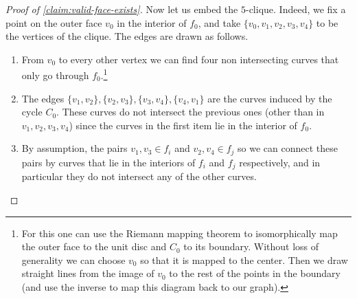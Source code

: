 \documentclass[10pt,a4paper]{article}
\newcommand{\prettyref}[1]{\cref{#1}}
\theoremstyle{definition}
\theoremstyle{remark}
\newcommand{\set}[1]{\{#1\}}
\numberwithin{equation}{section}
\let\pref=\prettyref
\begin{document}
\begin{proof}[Proof of \pref{claim:valid-face-exists}]
    Now let us embed the \(5\)-clique. Indeed, we fix a point on the outer face \(v_0\) in the interior of \(f_0\), and take \(\set{v_0,v_1,v_2,v_3,v_4}\) to be the vertices of the clique. The edges are drawn as follows.
    \begin{enumerate}
        \item From \(v_0\) to every other vertex we can find four non intersecting curves that only go through \(f_0\).\footnote{For this one can use the Riemann mapping theorem to isomorphically map the outer face to the unit disc and \(C_0\) to its boundary. Without loss of generality we can choose \(v_0\) so that it is mapped to the center. Then we draw straight lines from the image of \(v_0\) to the rest of the points in the boundary (and use the inverse to map this diagram back to our graph).}
        \item The edges \(\set{v_1,v_2},\set{v_2,v_3},\set{v_3,v_4},\set{v_4,v_1}\) are the curves induced by the cycle \(C_0\). These curves do not intersect the previous ones (other than in \(v_1,v_2,v_3,v_4\)) since the curves in the first item lie in the interior of \(f_0\).
        \item By assumption, the pairs \(v_1,v_3 \in f_i\) and \(v_2,v_4 \in f_j\) so we can connect these pairs by curves that lie in the interiors of \(f_i\) and \(f_j\) respectively, and in particular they do not intersect any of the other curves.
    \end{enumerate}
\end{proof}


    
\end{document}
